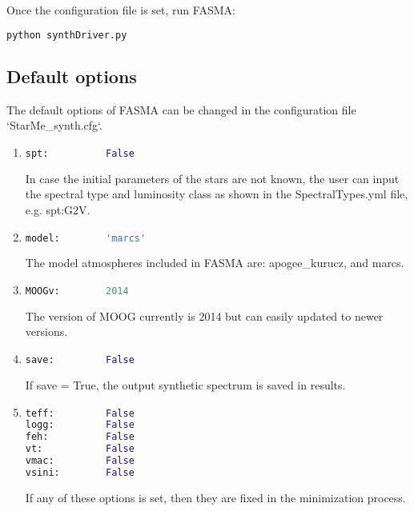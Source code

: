 \documentclass[a4paper,10pt]{article}
\begin{document}
Once the configuration file is set, run FASMA:
\begin{lstlisting}[language=Python]
python synthDriver.py
\end{lstlisting}


\subsection{Default options}

The default options of FASMA can be changed in the configuration file `StarMe\_synth.cfg`.
\begin{enumerate}
 \item
\begin{lstlisting}[language=Python]
spt:          False

\end{lstlisting}
In case the initial parameters of the stars are not known, the user can input the spectral type and luminosity class as shown in the SpectralTypes.yml file, e.g. spt:G2V.

\item
\begin{lstlisting}[language=Python]
model:        'marcs'
\end{lstlisting}
The model atmospheres included in FASMA are: apogee\_kurucz, and marcs.

\item
\begin{lstlisting}[language=Python]
MOOGv:        2014
\end{lstlisting}
The version of MOOG currently is 2014 but can easily updated to newer versions.

\item
\begin{lstlisting}[language=Python]
save:         False
\end{lstlisting}
If save = True, the output synthetic spectrum is saved in results.

\item
\begin{lstlisting}[language=Python]
teff:         False
logg:         False
feh:          False
vt:           False
vmac:         False
vsini:        False
\end{lstlisting}
If any of these options is set, then they are fixed in the minimization process.


\end{enumerate}
\end{document}
